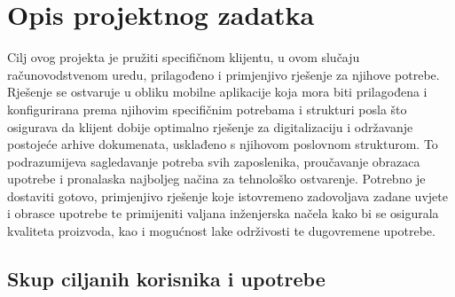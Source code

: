\chapter{Opis projektnog zadatka}
		
		Cilj ovog projekta je pružiti specifičnom klijentu, u ovom slučaju računovodstvenom uredu, prilagođeno i primjenjivo rješenje za njihove potrebe. Rješenje se ostvaruje u obliku mobilne aplikacije koja mora biti prilagođena i konfigurirana prema njihovim specifičnim potrebama i strukturi posla što osigurava da klijent dobije optimalno rješenje za digitalizaciju i održavanje postojeće arhive dokumenata, usklađeno s njihovom poslovnom strukturom. To podrazumijeva sagledavanje potreba svih zaposlenika, proučavanje obrazaca upotrebe i pronalaska najboljeg načina za tehnološko ostvarenje. Potrebno je dostaviti gotovo, primjenjivo rješenje koje istovremeno zadovoljava zadane uvjete i obrasce upotrebe te primijeniti valjana inženjerska načela kako bi se osigurala kvaliteta proizvoda, kao i mogućnost lake održivosti te dugovremene upotrebe.
		\eject

		\section{Skup ciljanih korisnika i upotrebe}
		

